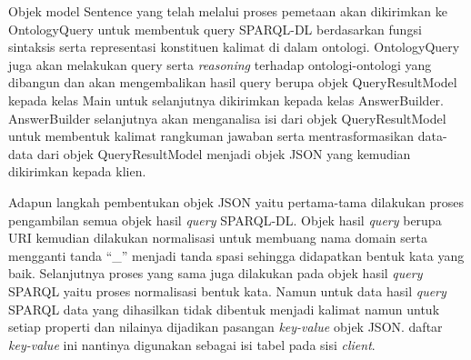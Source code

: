 Objek model Sentence yang telah melalui proses pemetaan akan dikirimkan ke OntologyQuery untuk membentuk query SPARQL-DL berdasarkan fungsi sintaksis serta representasi konstituen kalimat di dalam ontologi. OntologyQuery juga akan melakukan query serta \emph{reasoning} terhadap ontologi-ontologi yang dibangun dan akan mengembalikan hasil query berupa objek QueryResultModel kepada kelas Main untuk selanjutnya dikirimkan kepada kelas AnswerBuilder. AnswerBuilder selanjutnya akan menganalisa isi dari objek QueryResultModel untuk membentuk kalimat rangkuman jawaban serta mentrasformasikan data-data dari objek QueryResultModel menjadi objek JSON yang kemudian dikirimkan kepada klien.

Adapun langkah pembentukan objek JSON yaitu pertama-tama dilakukan proses pengambilan semua objek hasil \emph{query} SPARQL-DL. Objek hasil \emph{query} berupa URI kemudian dilakukan normalisasi untuk membuang nama domain serta mengganti tanda ``\_'' menjadi tanda spasi sehingga didapatkan bentuk kata yang baik. Selanjutnya proses yang sama juga dilakukan pada objek hasil \emph{query} SPARQL yaitu proses normalisasi bentuk kata. Namun untuk data hasil \emph{query} SPARQL data yang dihasilkan tidak dibentuk menjadi kalimat namun untuk setiap properti dan nilainya dijadikan pasangan \emph{key-value} objek JSON. daftar \emph{key-value} ini nantinya digunakan sebagai isi tabel pada sisi \emph{client}.